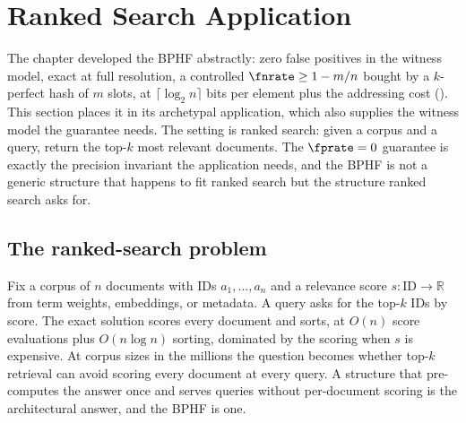 %

\section{Ranked Search Application}
\label{sec:ranked-search}

The chapter developed the BPHF abstractly: zero false positives in the
witness model, exact at full resolution, a controlled $\fnrate \ge 1 -
m/n$ bought by a $k$-perfect hash of $m$ slots, at $\lceil \log_2 n
\rceil$ bits per element plus the addressing cost
(). This section places it
in its archetypal application, which also supplies the witness model the
guarantee needs. The setting is ranked search: given a corpus and a
query, return the top-$k$ most relevant documents. The $\fprate = 0$
guarantee is exactly the precision invariant the application needs, and
the BPHF is not a generic structure that happens to fit ranked search but
the structure ranked search asks for.

\subsection*{The ranked-search problem}

Fix a corpus of $n$ documents with IDs $a_1, \ldots, a_n$ and a relevance
score $s : \text{ID} \to \mathbb{R}$ from term weights, embeddings, or
metadata. A query asks for the top-$k$ IDs by score. The exact solution
scores every document and sorts, at $O(n)$ score evaluations plus
$O(n \log n)$ sorting, dominated by the scoring when $s$ is expensive. At
corpus sizes in the millions the question becomes whether top-$k$
retrieval can avoid scoring every document at every query. A structure
that pre-computes the answer once and serves queries without per-document
scoring is the architectural answer, and the BPHF is one.


